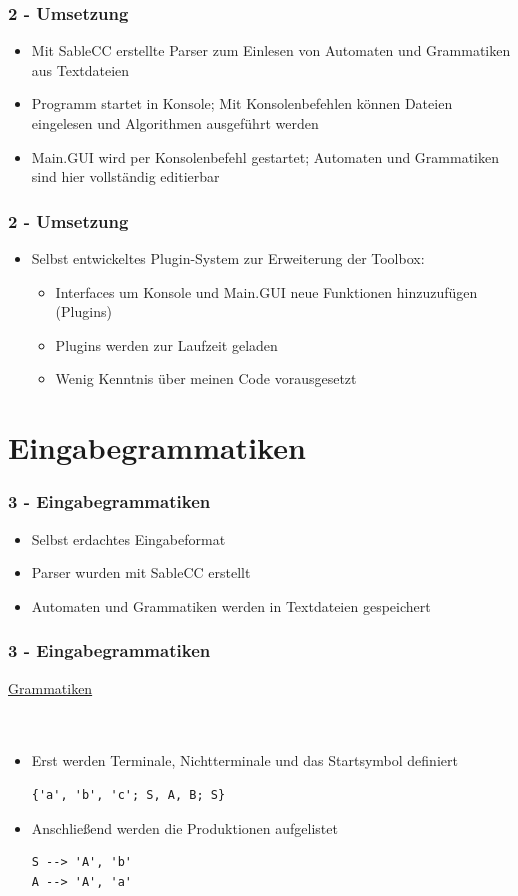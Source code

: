 \documentclass[9pt, xcolor={dvipsnames}]{beamer}
\begin{document}
\begin{frame}\frametitle{2 - Umsetzung}
	\begin{itemize}
		\item Mit SableCC erstellte Parser zum Einlesen von Automaten und Grammatiken aus Textdateien
		\item Programm startet in Konsole; Mit Konsolenbefehlen können Dateien eingelesen und Algorithmen ausgeführt werden
		\item Main.GUI wird per Konsolenbefehl gestartet; Automaten und Grammatiken sind hier vollständig editierbar
	\end{itemize}
\end{frame}

\begin{frame}\frametitle{2 - Umsetzung}
	\begin{itemize}
		\item Selbst entwickeltes Plugin-System zur Erweiterung der Toolbox:
		\begin{itemize}
			\item Interfaces um Konsole und Main.GUI neue Funktionen hinzuzufügen (Plugins)
			\item Plugins werden zur Laufzeit geladen
			\item Wenig Kenntnis über meinen Code vorausgesetzt
		\end{itemize}
	\end{itemize}
\end{frame}

\section{Eingabegrammatiken}
\begin{frame}\frametitle{3 - Eingabegrammatiken}
	\begin{itemize}
		\item Selbst erdachtes Eingabeformat
		\item Parser wurden mit SableCC erstellt
		\item Automaten und Grammatiken werden in Textdateien gespeichert
	\end{itemize}
\end{frame}

\begin{frame}[fragile]\frametitle{3 - Eingabegrammatiken}
	{ \fontsize{20}{20} \selectfont \underline{Grammatiken}}
	\ \\
	\ \\
	\ \\
	\pause
	\begin{itemize}
		\item Erst werden Terminale, Nichtterminale und das Startsymbol definiert
        \begin{lstlisting}[frame=single]
{'a', 'b', 'c'; S, A, B; S}
        \end{lstlisting}
        \pause
        \item Anschließend werden die Produktionen aufgelistet
        \begin{lstlisting}[frame=single]
S --> 'A', 'b'
A --> 'A', 'a'
        \end{lstlisting}    
	\end{itemize}
\end{frame}
\end{document}
